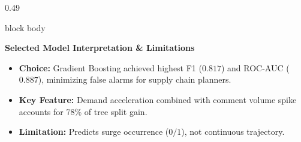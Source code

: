 \documentclass[aspectratio=169, 10pt]{beamer}
\newenvironment{card}[1][]{%
        \begin{beamercolorbox}[rounded=true,shadow=false,wd=\linewidth,sep=3.5pt,#1]{block body}%
        \fontsize{7.8pt}{9.8pt}\selectfont%
    }{%
        \end{beamercolorbox}%
    }
\begin{document}
\begin{frame}[t]
\begin{columns}[T]
            \begin{column}{0.49\textwidth}                                                                                                                                                             
                \begin{card}                                                                                                                                                                           
                    {\fontsize{7.5pt}{9pt}\selectfont \textbf{\color{BlueAccent}Selected Model Interpretation \& Limitations}}\\[0.04cm]                                                               
                    \begin{itemize}\setlength{\itemsep}{1.5pt}                                                                                                                                         
                        \item \textbf{Choice:} Gradient Boosting achieved highest F1 ($0.817$) and ROC-AUC ($0.887$), minimizing false alarms for supply chain planners.                               
                        \item \textbf{Key Feature:} Demand acceleration combined with comment volume spike accounts for 78\% of tree split gain.                                                       
                        \item \textbf{Limitation:} Predicts surge occurrence ($0/1$), not continuous trajectory.                                                                                       
                    \end{itemize}                                                                                                                                                                      
                \end{card}                                                                                                                                                                             
            \end{column}                                                                                                                                                                               
        \end{columns}                                                                                                                                                                                  
    \end{frame}                                                                                                                                                                                        
                                                                                                                                                                                                       
\end{document}
